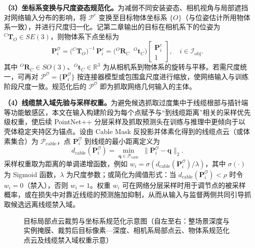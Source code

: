 \textbf{（3）坐标系变换与尺度姿态规范化。}为减弱不同安装姿态、相机视角与局部遮挡对网络输入分布的影响，将 $\mathcal{P}^c$ 变换至目标物体坐标系 $\{O\}$（与位姿估计所用物体系一致），并进行尺度归一化。记第二章输出的目标在相机系下的位姿为 ${}^C\mathbf{T}_O\in SE(3)$，则物体系下点坐标为
\begin{equation}
  \mathbf{P}_i^{\mathcal{O}}=\bigl({}^C\mathbf{T}_O\bigr)^{-1}\,\mathbf{P}_i^c=\bigl({}^O\mathbf{R}_C\;\; {}^O\mathbf{t}_C\bigr)\begin{bmatrix} \mathbf{P}_i^c\\ 1 \end{bmatrix},\quad i\in\mathcal{I}_{\mathrm{obj}}.
  \label{eq:ch3:Toc}
\end{equation}
其中 ${}^O\mathbf{R}_C\in SO(3)$、${}^O\mathbf{t}_C\in\mathbb{R}^3$ 为从相机系到物体系的旋转与平移。若需尺度统一，可再对 $\mathcal{P}^{\mathcal{O}}=\{\mathbf{P}_i^{\mathcal{O}}\}$ 按连接器模型或包围盒尺度进行缩放，使网络输入与训练阶段尺度一致。规范化后的 $\mathcal{P}^{\mathcal{O}}$ 即为抓取网络几何输入的主体。

\textbf{（4）线缆禁入域先验与采样权重。}为避免候选抓取过度集中于线缆根部与插针端等功能敏感区，本文在输入构建阶段为每个点赋予与“到线缆距离”相关的采样优先级权重，使后续 PointNet++ 分层采样及抓取预测头在训练与推理中更倾向于以壳体稳定夹持区为锚点。设由 Cable Mask 反投影并体素化得到的线缆点云（或体素集合）为 $\mathcal{P}_{\mathrm{cable}}$，点 $\mathbf{P}_i^{\mathcal{O}}$ 到线缆的最小距离定义为
\begin{equation}
  d_{\mathrm{cable}}(\mathbf{P}_i^{\mathcal{O}})=\min_{\mathbf{q}\in\mathcal{P}_{\mathrm{cable}}}\;\bigl\|\mathbf{P}_i^{\mathcal{O}}-\mathbf{q}\bigr\|_2.
  \label{eq:ch3:dcable}
\end{equation}
采样权重取为距离的单调递增函数，例如 $w_i=\sigma(d_{\mathrm{cable}}(\mathbf{P}_i^{\mathcal{O}})/\lambda)$，其中 $\sigma(\cdot)$ 为 Sigmoid 函数，$\lambda$ 为尺度参数；或简化为阈值形式：当 $d_{\mathrm{cable}}(\mathbf{P}_i^{\mathcal{O}})<\rho$ 时令 $w_i=0$（禁入），否则 $w_i=1$。权重 $w_i$ 可在网络分层采样时用于调节点的被采样概率，或在损失中对靠近线缆的预测施加抑制，从而从输入与监督两侧共同引导抓取候选远离线缆禁入域。

\begin{figure}[htbp]
  \centering
  \caption{目标局部点云裁剪与坐标系规范化示意图（自左至右：整场景深度与实例掩膜、裁剪后目标像素—深度、相机系局部点云、物体系规范化点云及线缆禁入域权重示意）}
  \label{fig:ch3:pointcloud}
\end{figure}

